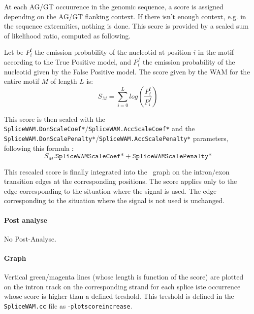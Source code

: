 At each AG/GT occuurence in the genomic sequence, a score is assigned
depending on the AG/GT flanking context. If there isn't enough
context, e.g. in the sequence extremities, nothing is done.  This
score is provided by a scaled sum of likelihood ratio, computed as
following.

Let be $P^t_i$ the emission probability of the nucleotid at position
$i$ in the motif according to the True Positive model, and $P^f_i$ the
emission probability of the nucleotid given by the False Positive
model. The score given by the WAM for the entire motif $M$ of length
$L$ is:
\[ S_M = \sum_{i=0}^{L} log\left(\frac{P^t_i}{P^f_i}\right) \]

This score is then scaled with the
\texttt{SpliceWAM.DonScaleCoef*}/\texttt{SpliceWAM.AccScaleCoef*} and
the
\texttt{SpliceWAM.DonScalePenalty*}/\texttt{SpliceWAM.AccScalePenalty*}
parameters, following this formula :
$$S_M . \texttt{SpliceWAMScaleCoef*} + \texttt{SpliceWAMScalePenalty*}$$

This rescaled score is finally integrated into the \EuGene\ graph on
the intron/exon transition edges at the corresponding positions. The
score applies only to the edge corresponding to the situation where
the signal is used. The edge corresponding to the situation where the
signal is not used is unchanged.

\paragraph{Post analyse}

No Post-Analyse.

\paragraph{Graph}

Vertical green/magenta lines (whose length is function of the score)
are plotted on the intron track on the corresponding strand for each
splice iste occurrence whose score is higher than a defined
treshold. This treshold is defined in the \texttt{SpliceWAM.cc} file
as -\texttt{plotscoreincrease}.
